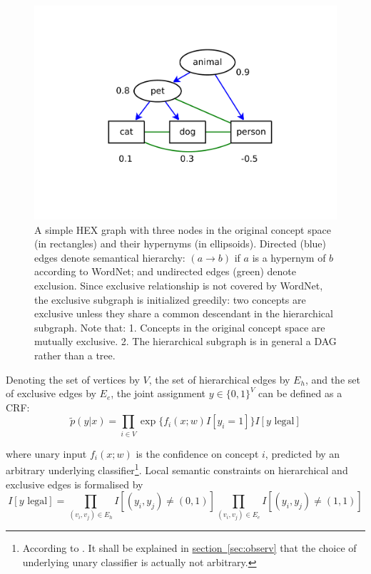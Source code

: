\documentclass[11pt,a4paper]{article}
\begin{document}
\begin{figure}[htbp]
\centering
\includegraphics[scale=0.5]{naive.pdf}
\caption{A simple HEX graph with three nodes in the original concept space (in rectangles) and their hypernyms (in ellipsoids). Directed (blue) edges denote semantical hierarchy: $(a\rightarrow b)$ if $a$ is a hypernym of $b$ according to WordNet; and undirected edges (green) denote exclusion. Since exclusive relationship is not covered by WordNet, the exclusive subgraph is initialized greedily: two concepts are exclusive unless they share a common descendant in the hierarchical subgraph. Note that: 1. Concepts in the original concept space are mutually exclusive. 2. The hierarchical subgraph is in general a DAG rather than a tree.}
\label{fig:naive}
\end{figure}

Denoting the set of vertices by $V$, the set of hierarchical edges by $E_h$, and the set of exclusive edges by $E_e$, the joint assignment $y\in\{0,1\}^V$ can be defined as a CRF:
\begin{equation}
\tilde{p}(y|x)=\prod_{i\in V}\exp\{f_i(x;w)I[y_i=1]\}I[y\text{ legal}]
\label{eqn:naive}
\end{equation}

where unary input $f_i(x;w)$ is the confidence on concept $i$, predicted by an arbitrary underlying classifier\footnote{According to \cite{deng2014large}. It shall be explained in \hyperref[sec:observ]{section~\ref{sec:observ}} that the choice of underlying unary classifier is actually not arbitrary.}. Local semantic constraints on hierarchical and exclusive edges is formalised by
\begin{equation}
I[y\text{ legal}]=\prod_{(v_i,v_j)\in E_h}I[(y_i,y_j)\neq(0,1)]\prod_{(v_i,v_j)\in E_e}I[(y_i,y_j)\neq(1,1)]
\label{eqn:legal}
\end{equation}
\end{document}
